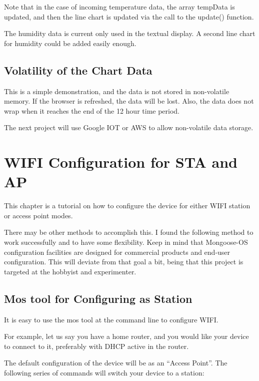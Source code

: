 \documentclass[oneside,letterpaper,12pt]{book}
\begin{document}
Note that in the case of incoming temperature data, the array tempData
is updated, and then the line chart is updated via the call to the
update() function.

The humidity data is current only used in the textual display. A second
line chart for humidity could be added easily enough.

\section{Volatility of the Chart
Data}\label{volatility-of-the-chart-data}

This is a simple demonstration, and the data is not stored in
non-volatile memory. If the browser is refreshed, the data will be lost.
Also, the data does not wrap when it reaches the end of the 12 hour time
period.

The next project will use Google IOT or AWS to allow non-volatile data
storage.

\chapter{WIFI Configuration for STA and
AP}\label{wifi-configuration-for-sta-and-ap}

This chapter is a tutorial on how to configure the device for either
WIFI station or access point modes.

There may be other methods to accomplish this. I found the following
method to work successfully and to have some flexibility. Keep in mind
that Mongoose-OS configuration facilities are designed for commercial
products and end-user configuration. This will deviate from that goal a
bit, being that this project is targeted at the hobbyist and
experimenter.

\section{Mos tool for Configuring as
Station}\label{mos-tool-for-configuring-as-station}

It is easy to use the mos tool at the command line to configure WIFI.

For example, let us say you have a home router, and you would like your
device to connect to it, preferably with DHCP active in the router.

The default configuration of the device will be as an ``Access Point''.
The following series of commands will switch your device to a station:
\end{document}
